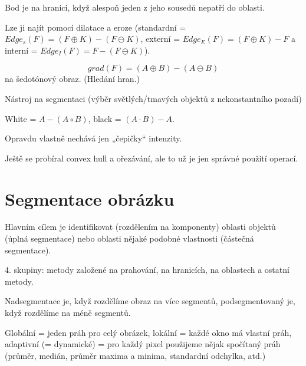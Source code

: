 \documentclass[12pt]{article}					%
\begin{document}
\begin{definice}[Hranice]
	Bod je na hranici, když alespoň jeden z jeho sousedů nepatří do oblasti.

	Lze ji najít pomocí dilatace a eroze (standardní = $Edge_s(F) = (F \oplus K) - (F \ominus K)$, externí = $Edge_E(F) = (F \oplus K) - F$ a interní = $Edge_I(F) = F - (F \ominus K)$).
\end{definice}

\begin{definice}[Gradient]
	$$ grad(F) = (A \oplus B) - (A \ominus B) $$
	na šedotónový obraz. (Hledání hran.)
\end{definice}

\begin{definice}
	Nástroj na segmentaci (výběr světlých/tmavých objektů z nekonstantního pozadí)

	White = $A - (A \circ B)$, black = $(A \cdot B) - A$.

	Opravdu vlastně nechává jen „čepičky“ intenzity.
\end{definice}

\begin{poznamka}
	Ještě se probíral convex hull a ořezávání, ale to už je jen správné použití operací.
\end{poznamka}


\section{Segmentace obrázku}
\begin{definice}[Segmentace]
	Hlavním cílem je identifikovat (rozdělením na komponenty) oblasti objektů (úplná segmentace) nebo oblasti nějaké podobné vlastnosti (částečná segmentace).

	4. skupiny: metody založené na prahování, na hranicích, na oblastech a ostatní metody.
\end{definice}

\begin{definice}
	Nadsegmentace je, když rozdělíme obraz na více segmentů, podsegmentovaný je, když rozdělíme na méně segmentů.
\end{definice}

\begin{definice}[Prahování]
	Globální = jeden práh pro celý obrázek, lokální = každé okno má vlastní práh, adaptivní (= dynamické) = pro každý pixel použijeme nějak spočítaný práh (průměr, medián, průměr maxima a minima, standardní odchylka, atd.)
\end{definice}
\end{document}
